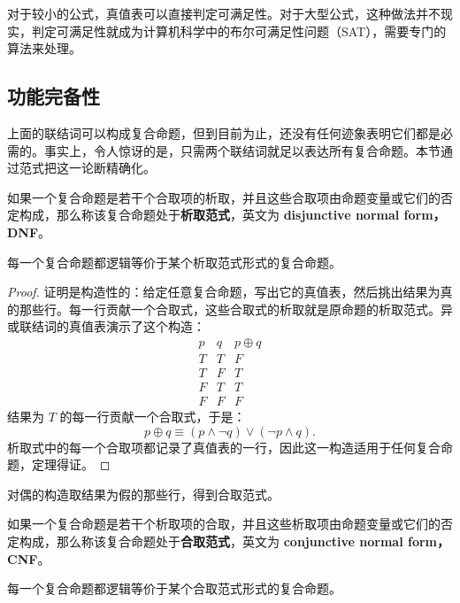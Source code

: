 对于较小的公式，真值表可以直接判定可满足性。对于大型公式，这种做法并不现实，判定可满足性就成为计算机科学中的布尔可满足性问题（SAT），需要专门的算法来处理。

\subsection{功能完备性}

上面的联结词可以构成复合命题，但到目前为止，还没有任何迹象表明它们都是必需的。事实上，令人惊讶的是，只需两个联结词就足以表达所有复合命题。本节通过范式把这一论断精确化。

\begin{definition}[析取范式]
如果一个复合命题是若干个合取项的析取，并且这些合取项由命题变量或它们的否定构成，那么称该复合命题处于\textbf{析取范式}，英文为 \textbf{disjunctive normal form，DNF}。
\end{definition}

\begin{theorem}\label{thm:dnf-cn}
每一个复合命题都逻辑等价于某个析取范式形式的复合命题。
\end{theorem}

\begin{proof}
证明是构造性的：给定任意复合命题，写出它的真值表，然后挑出结果为真的那些行。每一行贡献一个合取式，这些合取式的析取就是原命题的析取范式。异或联结词的真值表演示了这个构造：
\[
\begin{array}{c|c|c}
p & q & p\oplus q \\
\hline
T & T & F \\
T & F & T \\
F & T & T \\
F & F & F
\end{array}
\]
结果为 $T$ 的每一行贡献一个合取式，于是：
\[
p\oplus q\equiv(p\wedge\neg q)\vee(\neg p\wedge q).
\]
析取式中的每一个合取项都记录了真值表的一行，因此这一构造适用于任何复合命题，定理得证。
\end{proof}

对偶的构造取结果为假的那些行，得到合取范式。

\begin{definition}[合取范式]
如果一个复合命题是若干个析取项的合取，并且这些析取项由命题变量或它们的否定构成，那么称该复合命题处于\textbf{合取范式}，英文为 \textbf{conjunctive normal form，CNF}。
\end{definition}

\begin{theorem}
每一个复合命题都逻辑等价于某个合取范式形式的复合命题。
\end{theorem}

